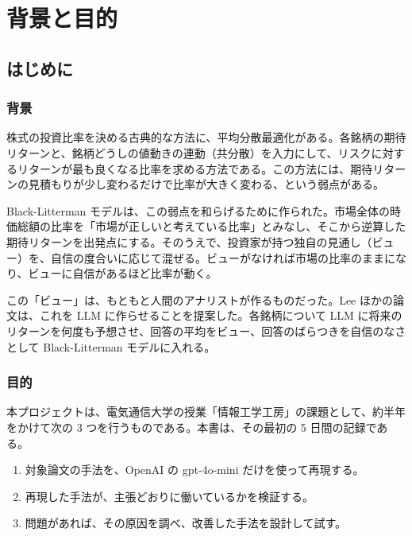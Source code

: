 \documentclass[xelatex,ja=standard,jafont=hiragino-pron,a4paper,10pt]{bxjsreport}
\begin{document}
\setcounter{tocdepth}{1}
\tableofcontents

\part{背景と目的}

\chapter{はじめに}\label{ch:intro}

\section{背景}

株式の投資比率を決める古典的な方法に、平均分散最適化がある。各銘柄の期待リターンと、銘柄どうしの値動きの連動（共分散）を入力にして、リスクに対するリターンが最も良くなる比率を求める方法である。この方法には、期待リターンの見積もりが少し変わるだけで比率が大きく変わる、という弱点がある。

Black-Litterman モデルは、この弱点を和らげるために作られた。市場全体の時価総額の比率を「市場が正しいと考えている比率」とみなし、そこから逆算した期待リターンを出発点にする。そのうえで、投資家が持つ独自の見通し（ビュー）を、自信の度合いに応じて混ぜる。ビューがなければ市場の比率のままになり、ビューに自信があるほど比率が動く。

この「ビュー」は、もともと人間のアナリストが作るものだった。Lee ほかの論文は、これを LLM に作らせることを提案した。各銘柄について LLM に将来のリターンを何度も予想させ、回答の平均をビュー、回答のばらつきを自信のなさとして Black-Litterman モデルに入れる。

\section{目的}

本プロジェクトは、電気通信大学の授業「情報工学工房」の課題として、約半年をかけて次の 3 つを行うものである。本書は、その最初の 5 日間の記録である。

\begin{enumerate}
\item 対象論文の手法を、OpenAI の gpt-4o-mini だけを使って再現する。
\item 再現した手法が、主張どおりに働いているかを検証する。
\item 問題があれば、その原因を調べ、改善した手法を設計して試す。
\end{enumerate}
\end{document}
